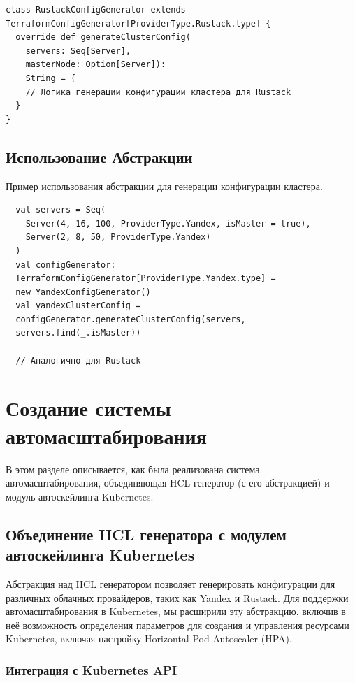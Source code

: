 \begin{verbatim}
class RustackConfigGenerator extends
TerraformConfigGenerator[ProviderType.Rustack.type] {
  override def generateClusterConfig(
    servers: Seq[Server],
    masterNode: Option[Server]):
    String = {
    // Логика генерации конфигурации кластера для Rustack
  }
}
\end{verbatim}

\subsection{Использование Абстракции}
Пример использования абстракции для генерации конфигурации кластера.

\begin{verbatim}
  val servers = Seq(
    Server(4, 16, 100, ProviderType.Yandex, isMaster = true),
    Server(2, 8, 50, ProviderType.Yandex)
  )
  val configGenerator: 
  TerraformConfigGenerator[ProviderType.Yandex.type] = 
  new YandexConfigGenerator()
  val yandexClusterConfig = 
  configGenerator.generateClusterConfig(servers,
  servers.find(_.isMaster))
  
  // Аналогично для Rustack
\end{verbatim}

\section{Создание системы автомасштабирования}

В этом разделе описывается, как была реализована система автомасштабирования,
объединяющая HCL генератор (с его абстракцией) и модуль автоскейлинга
Kubernetes.

\subsection{Объединение HCL генератора с модулем автоскейлинга Kubernetes}

Абстракция над HCL генератором позволяет генерировать конфигурации для различных
облачных провайдеров, таких как Yandex и Rustack. Для поддержки
автомасштабирования в Kubernetes, мы расширили эту абстракцию, включив в неё
возможность определения параметров для создания и управления ресурсами
Kubernetes, включая настройку Horizontal Pod Autoscaler (HPA).

\subsubsection{Интеграция с Kubernetes API}

